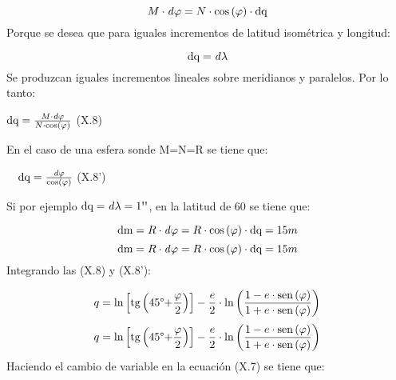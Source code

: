 \documentclass{tufte-book}
\newcommand\normalsubformula[1]{\text{\mathversion{normal}$#1$}}
\begin{document}
\begin{equation*}
{M\cdot \mathit{d\varphi }=N\cdot \text{cos}\left(\varphi \right)\cdot
\normalsubformula{\text{dq}}}
\end{equation*}
Porque se desea que para iguales incrementos de latitud isométrica y
longitud:

\begin{equation*}
{\normalsubformula{\text{dq}}=\mathit{d\lambda }}
\end{equation*}
Se produzcan iguales incrementos lineales sobre meridianos y paralelos.
Por lo tanto:

 ${\normalsubformula{\text{dq}}=\frac{M\cdot \mathit{d\varphi }}{N\cdot
\text{cos}\left(\varphi \right)}}$  (X.8)

En el caso de una esfera sonde M=N=R se tiene que:

\ \  ${\normalsubformula{\text{dq}}=\frac{\mathit{d\varphi
}}{\text{cos}\left(\varphi \right)}}$  (X.8{\textquoteright})

Si por ejemplo  ${\normalsubformula{\text{dq}}=\mathit{d\lambda
}=1\text{{\textquotesingle}{\textquotesingle}}}$, en la latitud de
60{\textdegree} se tiene que:

\begin{equation*}
{\normalsubformula{\text{dm}}=R\cdot \mathit{d\varphi }=R\cdot
\text{cos}\left(\varphi \right)\cdot
\normalsubformula{\text{dq}}=\text{15}m}
\end{equation*}
\begin{equation*}
{\normalsubformula{\text{dm}}=R\cdot \mathit{d\varphi }=R\cdot
\text{cos}\left(\varphi \right)\cdot
\normalsubformula{\text{dq}}=\text{15}m}
\end{equation*}
Integrando las (X.8) y (X.8{\textquoteright}):

\begin{equation*}
{q=\text{ln}\left[\normalsubformula{\text{tg}}\left(\text{45}\text{{\textdegree}+}\frac{\varphi
}{2}\right)\right]-\frac{e}{2}\cdot \text{ln}\left(\frac{1-e\cdot
\normalsubformula{\text{sen}}\left(\varphi \right)}{1+e\cdot
\normalsubformula{\text{sen}}\left(\varphi \right)}\right)}
\end{equation*}
\begin{equation*}
{q=\text{ln}\left[\normalsubformula{\text{tg}}\left(\text{45}\text{{\textdegree}+}\frac{\varphi
}{2}\right)\right]-\frac{e}{2}\cdot \text{ln}\left(\frac{1-e\cdot
\normalsubformula{\text{sen}}\left(\varphi \right)}{1+e\cdot
\normalsubformula{\text{sen}}\left(\varphi \right)}\right)}
\end{equation*}
Haciendo el cambio de variable en la ecuación (X.7) se tiene que:
\end{document}
